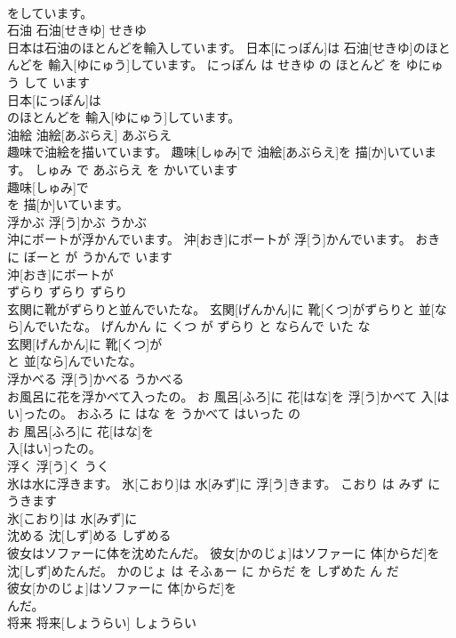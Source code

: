 \documentclass[8pt]{extreport}
\begin{document}
\begin{CJK}{UTF8}{min}
\\	をしています。			
\\	石油	石油[せきゆ]	せきゆ	
\\	日本は石油のほとんどを輸入しています。	日本[にっぽん]は 石油[せきゆ]のほとんどを 輸入[ゆにゅう]しています。	にっぽん は せきゆ の ほとんど を ゆにゅう して います	
\\	日本[にっぽん]は
\\	のほとんどを 輸入[ゆにゅう]しています。			
\\	油絵	油絵[あぶらえ]	あぶらえ	
\\	趣味で油絵を描いています。	趣味[しゅみ]で 油絵[あぶらえ]を 描[か]いています。	しゅみ で あぶらえ を かいています	
\\	趣味[しゅみ]で
\\	を 描[か]いています。			
\\	浮かぶ	浮[う]かぶ	うかぶ	
\\	沖にボートが浮かんでいます。	沖[おき]にボートが 浮[う]かんでいます。	おき に ぼーと が うかんで います	
\\	沖[おき]にボートが
\\	ずらり	ずらり	ずらり	
\\	玄関に靴がずらりと並んでいたな。	玄関[げんかん]に 靴[くつ]がずらりと 並[なら]んでいたな。	げんかん に くつ が ずらり と ならんで いた な	
\\	玄関[げんかん]に 靴[くつ]が
\\	と 並[なら]んでいたな。			
\\	浮かべる	浮[う]かべる	うかべる	
\\	お風呂に花を浮かべて入ったの。	お 風呂[ふろ]に 花[はな]を 浮[う]かべて 入[はい]ったの。	おふろ に はな を うかべて はいった の	
\\	お 風呂[ふろ]に 花[はな]を
\\	入[はい]ったの。			
\\	浮く	浮[う]く	うく	
\\	氷は水に浮きます。	氷[こおり]は 水[みず]に 浮[う]きます。	こおり は みず に うきます	
\\	氷[こおり]は 水[みず]に
\\	沈める	沈[しず]める	しずめる	
\\	彼女はソファーに体を沈めたんだ。	彼女[かのじょ]はソファーに 体[からだ]を 沈[しず]めたんだ。	かのじょ は そふぁー に からだ を しずめた ん だ	
\\	彼女[かのじょ]はソファーに 体[からだ]を
\\	んだ。			
\\	将来	将来[しょうらい]	しょうらい	

\end{CJK}
\end{document}

